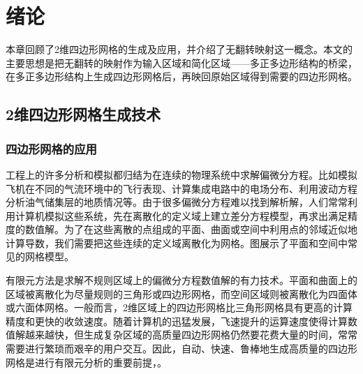 \chapter{绪论}\label{intro}
本章回顾了2维四边形网格的生成及应用，并介绍了无翻转映射这一概念。本文的主要思想是把无翻转的映射作为输入区域和简化区域——多正多边形结构的桥梁，在多正多边形结构上生成四边形网格后，再映回原始区域得到需要的四边形网格。
\section{2维四边形网格生成技术}\label{quad-teche}
\subsection{四边形网格的应用}\label{application}
工程上的许多分析和模拟都归结为在连续的物理系统中求解偏微分方程。比如模拟飞机在不同的气流环境中的飞行表现、计算集成电路中的电场分布、利用波动方程分析油气储集层的地质情况等。由于很多偏微分方程难以找到解析解，人们常常利用计算机模拟这些系统，先在离散化的定义域上建立差分方程模型，再求出满足精度的数值解。为了在这些离散的点组成的平面、曲面或空间中利用点的邻域近似地计算导数，我们需要把这些连续的定义域离散化为网格。图展示了平面和空间中常见的网格模型。

有限元方法是求解不规则区域上的偏微分方程数值解的有力技术。平面和曲面上的区域被离散化为尽量规则的三角形或四边形网格，而空间区域则被离散化为四面体或六面体网格。一般而言，2维区域上的四边形网格比三角形网格具有更高的计算精度和更快的收敛速度。随着计算机的迅猛发展，飞速提升的运算速度使得计算数值解越来越快，但生成复杂区域的高质量四边形网格仍然要花费大量的时间，常常需要进行繁琐而艰辛的用户交互。因此，自动、快速、鲁棒地生成高质量的四边形网格是进行有限元分析的重要前提，。
